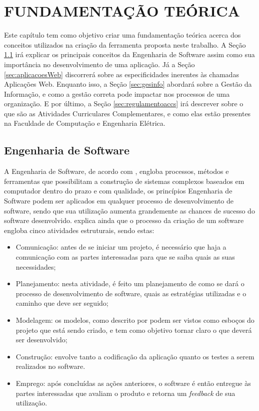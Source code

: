 
\chapter{FUNDAMENTAÇÃO TEÓRICA}
\label{chap:fundamentacaoTeorica}

Este capítulo tem como objetivo criar uma fundamentação teórica acerca dos conceitos utilizados na criação da ferramenta proposta neste trabalho. A Seção \ref{sec:engsoft} irá explicar os principais conceitos da Engenharia de Software assim como sua importância no desenvolvimento de uma aplicação. Já a Seção \ref{sec:aplicacoesWeb} discorrerá sobre as especificidades inerentes às chamadas Aplicações Web. Enquanto isso, a Seção \ref{sec:gesinfo} abordará sobre a Gestão da Informação, e como a gestão correta pode impactar nos processos de uma organização. E por último, a Seção \ref{sec:regulamentoaccs} irá descrever sobre o que são as Atividades Curriculares Complementares, e como elas estão presentes na Faculdade de Computação e Engenharia Elétrica.

\section{Engenharia de Software}
\label{sec:engsoft}

A Engenharia de Software, de acordo com \cite{pressman2009engenharia}, engloba processos, métodos e ferramentas que possibilitam a construção de sistemas complexos baseados em computador dentro do prazo e com qualidade, os princípios Engenharia de Software podem ser aplicados em qualquer processo de desenvolvimento de software, sendo que sua utilização aumenta grandemente as chances de sucesso do software desenvolvido. \cite{pressman2009engenharia} explica ainda que o processo da criação de um software engloba cinco atividades estruturais, sendo estas:

\begin{itemize}
    \item Comunicação: antes de se iniciar um projeto, é necessário que haja a comunicação com as partes interessadas para que se saiba quais as suas necessidades;
    \item Planejamento: nesta atividade, é feito um planejamento de como se dará o processo de desenvolvimento de software, quais as estratégias utilizadas e o caminho que deve ser seguido;
    \item Modelagem: os modelos, como descrito por \cite{pressman2009engenharia} podem ser vistos como esboços do projeto que está sendo criado, e tem como objetivo tornar claro o que deverá ser desenvolvido;
    \item Construção: envolve tanto a codificação da aplicação quanto os testes a serem realizados no software.
    \item Emprego: após concluídas as ações anteriores, o software é então entregue às partes interessadas que avaliam o produto e retorna um \textit{feedback} de sua utilização.
\end{itemize}

